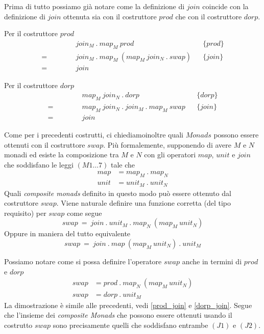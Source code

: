 Prima di tutto possiamo già notare come la definizione di $join$ coincide con la
definizione di $join$ ottenuta sia con il costruttore $prod$ che con il
costruttore $dorp$.
\begin{framed}
  Per il costruttore $prod$
  \begin{align*}
    \quad\qquad
    &\quad join_M\ .\ map_M\ prod && \{prod\}\\
    =&\quad join_M\ .\ map_M\ (map_M\ join_N\ .\ swap) && \{join\}\\
    =&\quad join
  \end{align*}

  Per il costruttore $dorp$
  \begin{align*}
    \quad\qquad
    &\quad map_M\ join_N\ .\ dorp && \{dorp\}\\
    =&\quad map_M\ join_N\ .\ join_M\ .\ map_M\ swap && \{join\}\\
    =&\quad join
  \end{align*}
\end{framed}

Come per i precedenti costrutti, ci chiediamoinoltre quali $Monads$ possono
essere ottenuti con il costruttore $swap$.
Più formalemente, supponendo di avere $M$ e $N$ monadi ed esiste la composizione
tra $M$ e $N$ con gli operatori $map$, $unit$ e $join$ che soddisfano le leggi
$(M1\dots7)$ tale che
\begin{align*}
  map &= map_M\ .\ map_N\\
  unit &= unit_M\ .\ unit_N
\end{align*}
Quali \textit{composite monads} definito in questo modo può essere ottenuto dal
costruttore $swap$.
Viene naturale definire una funzione corretta (del tipo requisito) per $swap$ come
segue
\begin{equation*}
  swap\ =\ join\ .\ unit_M\ .\ map_N\ (map_M\ unit_N)
\end{equation*}
Oppure in maniera del tutto equivalente
\begin{equation*}
  swap\ =\ join\ .\ map\ (map_M\ unit_N)\ .\ unit_M
\end{equation*}

Possiamo notare come si possa definire l'operatore $swap$ anche in termini di
$prod$ e $dorp$
\begin{align*}
  swap &= prod\ .\ map_N\ (map_M\ unit_N)\\
  swap &= dorp\ .\ unit_M
\end{align*}
La dimostrazione è simile alle precedenti, vedi \ref{prod_join}
e \ref{dorp_join}.
Segue che l'insieme dei \textit{composite Monads} che possono essere ottenuti
usando il costrutto $swap$ sono precisamente quelli che soddisfano entrambe
$(J1)$ e $(J2)$.

